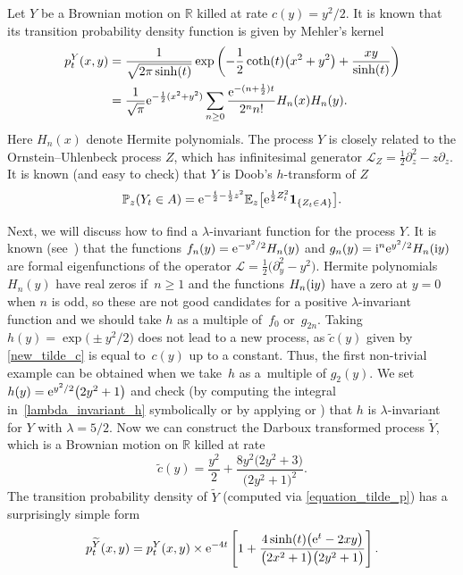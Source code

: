 \documentclass[10pt,a4paper]{amsart}
\numberwithin{equation}{section}
\theoremstyle{definition}
\def\L{{\mathcal L}}
\def\p{{\mathbb P}}
\def\e{{\mathbb E}}
\def\r{{\mathbb R}}
\def\i{{\textnormal i}}
\begin{document}
Let $Y$ be a Brownian motion on $\r$ killed at rate $c(y)=y^2/2$. It is known that its transition probability density function is given by
Mehler's kernel
\begin{align*}
p^Y_t(x,y)&=\frac{1}{\sqrt{2\pi \sinh(t)}}
\exp\left(- \frac{1}{2}\coth(t) \bigl(x^2+y^2\bigr) + \frac{xy}{\sinh(t)} \right)\\
&=
\frac{1}{\sqrt{\pi}} {\rm e}^{-\frac{1}{2} (x^2+y^2 )}\sum\limits_{n\ge 0} \frac{{\rm e}^{- (n+\frac{1}{2}) t}}{2^n n!} H_n(x) H_n(y).
\end{align*}
Here $H_n(x)$ denote Hermite polynomials.
The process $Y$ is closely related to the Ornstein--Uhlenbeck process $Z$, which has infinitesimal generator $\L_Z=\frac{1}{2} \partial_z^2 - z \partial_z$.
It is known (and easy to check) that $Y$ is Doob's $h$-transform of $Z$
\[
\p_z(Y_t \in A)={\rm e}^{-\frac{t}{2}-\frac{1}{2} z^2} \e_z\big[ {\rm e}^{\frac{1}{2} Z_t^2} {\mathbf 1}_{\{Z_t \in A\}}\big].
\]

Next, we will discuss how to find a $\lambda$-invariant function for the process $Y$. It is known (see~\cite[Example 2.3]{Gomez_2020}) that the functions $f_n(y)={\rm e}^{-y^2/2}H_n(y)$ and $ g_n(y)=\i^n {\rm e}^{y^2/2} H_n(\i y)$ are formal eigenfunctions of the operator $\L=\frac{1}{2} \bigl(\partial_y^2 - y^2\bigr)$. Hermite polynomials $H_n(y)$ have real zeros if~$n\ge 1$ and the functions $H_n(\i y)$ have a zero at $y=0$ when $n$ is odd, so these are not good candidates for
a positive $\lambda$-invariant function and we should take $h$ as a multiple of~$f_0$ or~$g_{2n}$. Taking $h(y)=\exp\bigl(\pm y^2/2\bigr)$ does not lead to a new process, as $\tilde c(y)$ given by \eqref{new_tilde_c} is equal to~$c(y)$ up to a constant. Thus, the first non-trivial example can be obtained when we take~$h$ as a~multiple of $g_2(y)$. We set $h(y)={\rm e}^{y^2/2} \bigl(2y^2+1\bigr)$ and check (by computing the integral in~\eqref{lambda_invariant_h} symbolically
or by applying \cite[Theorem 2.7]{Rogers_2021} or \cite[Corollary 2.2]{Mijatovic_2012}) that $h$ is $\lambda$-invariant for $Y$ with $\lambda=5/2$. Now we can construct the Darboux transformed process $\widetilde Y$, which is
 a Brownian motion on $\r$ killed at rate
\[
\tilde c(y)=\frac{y^2}{2}+\frac{8 y^2 \bigl(2y^2 + 3\bigr)}{\bigl(2y^2+1\bigr)^2}.
\]
The transition probability density of $\widetilde Y$ (computed via \eqref{equation_tilde_p}) has a surprisingly simple form
\begin{equation}\label{eq:tilde_p_OU}
p^{\widetilde Y}_t(x,y)
=p^Y_t(x,y) \times {\rm e}^{-4t}
\left[ 1 + \frac{4 \sinh(t) \bigl({\rm e}^{t}-2xy\bigr)}{\bigl(2x^2+1\bigr)\bigl(2y^2+1\bigr)}\right].
\end{equation}
\end{document}
